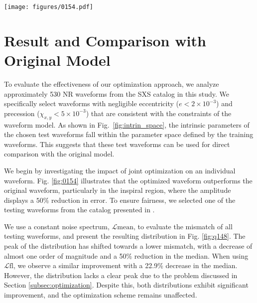 \documentclass[twocolumn]{aastex631}
\begin{document}
\begin{figure*}[t]
	\centering
	\texttt{[image: figures/0154.pdf]}
	\caption{Comparison between original and optimized IMRPhenomD waveforms.
	Here shows the SXS:BBH:0154 NR waveform, which has mass ratio $q=1$ and
	$\chi_1=\chi_2=-0.8$. The original mismatch is around $2.8\times10^{-4}$ and
	the optimized mismatch is around $5.3\times10^{-5}$. Top: It shows the
	amplitude and phase of NR, original IMRPhenomD and optimized IMRPhenomD
	waveform. Bottom: It shows the relative error of amplitudes between NR and
	IMRPhenomD waveforms, and the absolute error of phases between NR and
	IMRPhenomD waveforms}
	\label{fig:0154}
\end{figure*}

\section{Result and Comparison with Original Model} \label{sec:result}

To evaluate the effectiveness of our optimization approach, we analyze
approximately 530 NR waveforms from the SXS catalog in this study. We
specifically select waveforms with negligible eccentricity
(${e<2\times10^{-3}}$) and precession (${ \chi_{x,y}<5\times10^{-3}}$) that are
consistent with the constraints of the waveform model. As shown in
Fig.~\ref{fig:intrin_space}, the intrinsic parameters of the chosen test
waveforms fall within the parameter space defined by the training waveforms.
This suggests that these test waveforms can be used for direct comparison with
the original model.

We begin by investigating the impact of joint optimization on an individual
waveform. Fig. \ref{fig:0154} illustrates that the optimized waveform
outperforms the original waveform, particularly in the inspiral region, where
the amplitude displays a $50\%$ reduction in error. To ensure fairness, we
selected one of the testing waveforms from the catalog presented in
\citep{khan2016frequency}.

We use a constant noise spectrum, $\mathcal{L}{\mathrm{mean}}$, to evaluate the
mismatch of all testing waveforms, and present the resulting distribution in
Fig. \ref{fig:q148}. The peak of the distribution has shifted towards a lower
mismatch, with a decrease of almost one order of magnitude and a 50\% reduction
in the median. When using $\mathcal{L}{\mathrm{fl}}$, we observe a similar
improvement with a 22.9\% decrease in the median. However, the distribution lacks
a clear peak due to the problem discussed in Section \ref{subsec:optimization}.
Despite this, both distributions exhibit significant improvement, and the
optimization scheme remains unaffected.
\end{document}
